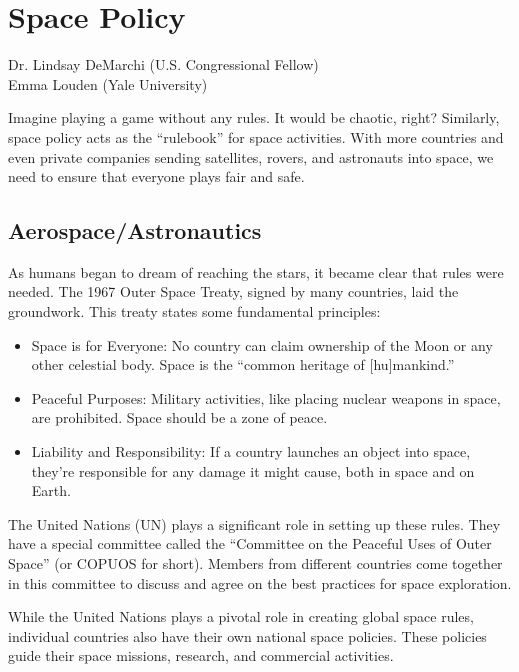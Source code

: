 \section{Space Policy}

\begin{sectionauthor}
    Dr. Lindsay DeMarchi (U.S. Congressional Fellow) \\
    Emma Louden (Yale University)
\end{sectionauthor}
\vspace{20pt}



\noindent Imagine playing a game without any rules. It would be chaotic, right? Similarly, space policy acts as the ``rulebook'' for space activities. With more countries and even private companies sending satellites, rovers, and astronauts into space, we need to ensure that everyone plays fair and safe.

\subsection{Aerospace/Astronautics}

As humans began to dream of reaching the stars, it became clear that rules were needed. The 1967 Outer Space Treaty, signed by many countries, laid the groundwork. This treaty states some fundamental principles:

\begin{itemize}
    \item Space is for Everyone: No country can claim ownership of the Moon or any other celestial body. Space is the ``common heritage of [hu]mankind.''
    \item Peaceful Purposes: Military activities, like placing nuclear weapons in space, are prohibited. Space should be a zone of peace.
    \item Liability and Responsibility: If a country launches an object into space, they're responsible for any damage it might cause, both in space and on Earth.
\end{itemize}

The United Nations (UN) plays a significant role in setting up these rules. They have a special committee called the ``Committee on the Peaceful Uses of Outer Space'' (or COPUOS for short). Members from different countries come together in this committee to discuss and agree on the best practices for space exploration. 

While the United Nations plays a pivotal role in creating global space rules, individual countries also have their own national space policies. These policies guide their space missions, research, and commercial activities.

